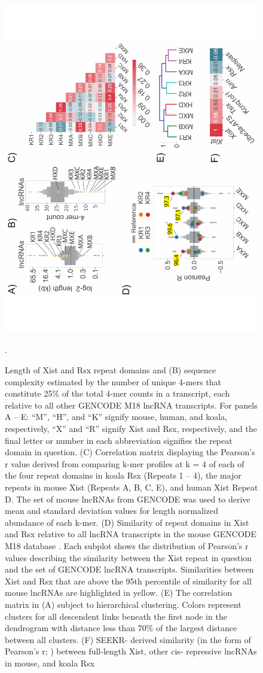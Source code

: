 \begin{figure}[!h]
\centering
\includegraphics[angle=-90,width=.8\textwidth]{images/fig2_-01.pdf}
\caption{Length of Xist and Rsx repeat domains and (B) sequence complexity estimated by the number of unique 4-mers that constitute 25\% of the total 4-mer counts in a transcript, each relative to all other GENCODE M18 lncRNA transcripts. For panels A – E: “M”, “H”, and “K” signify mouse, human, and koala, respectively, “X” and “R” signify Xist and Rsx, respectively, and the final letter or number in each abbreviation signifies the repeat domain in question. (C) Correlation matrix displaying the Pearson’s r value derived from comparing k-mer profiles at k = 4 of each of the four repeat domains in koala Rsx (Repeats 1 – 4), the major repeats in mouse Xist (Repeats A, B, C, E), and human Xist Repeat D. The set of mouse lncRNAs from GENCODE was used to derive mean and standard deviation values for length normalized abundance of each k-mer. (D) Similarity of repeat domains in Xist and Rsx relative to all lncRNA transcripts in the mouse GENCODE M18 database \cite{Derrien2012TheExpression}. Each subplot shows the distribution of Pearson’s r values describing the similarity between the Xist repeat in question and the set of GENCODE lncRNA transcripts. Similarities between Xist and Rsx that are above the 95th percentile of similarity for all mouse lncRNAs are highlighted in yellow. (E) The correlation matrix in (A) subject to hierarchical clustering. Colors represent clusters for all descendent links beneath the first node in the dendrogram with distance less than 70\% of the largest distance between all clusters. (F) SEEKR- derived similarity (in the form of Pearson’s r; \cite{Kirk2018FunctionalContent}) between full-length Xist, other cis- repressive lncRNAs in mouse, and koala Rsx \cite{Johnson2018AdaptationGenome}}. 
\end{figure}

